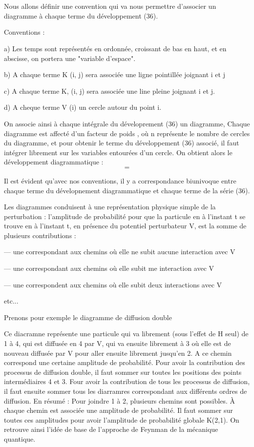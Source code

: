\section{}%

Nous allons définir une convention qui va nous permettre d'associer un diagramme à chaque terme du développement (36).

Conventions :

a) Les temps sont représentés en ordonnée, croissant de bas en
haut, et en abscisse, on portera une "variable d'espace".

b) A chaque terme K (i, j) sera associée une ligne pointillée
joignant i et j

c) A chaque terme K, (i, j) sera associée une line pleine joignant i et j.

d) A cheque terme V (i) un cercle autour du point i.

On associe ainsi à chaque intégrale du déveloprement (36) un
diagramme, Chaque diagramme est affecté d'un facteur de poids , où n
représente le nombre de cercles du diagramme, et pour obtenir le terme du
développement (36) associé, il faut intégrer librement sur les variables
entourées d'un cercle. On obtient alors le développement diagrammatique :
\[
\tag{37}=
\]

Il est évident qu'avec nos conventions, il y a correspondance
biunivoque entre chaque terme du dévelopnement diagrammatique et chaque
terme de la série (36).

Les diagrammes conduisent à une représentation physique simple de
la perturbation : l'amplitude de probabilité pour que la particule en
à l'instant t se trouve en à l'instant t, en présence du potentiel
perturbateur V, est la somme de plusieurs contributions :

— une correspondant aux chemins où elle ne subit aucune interaction avec V

— une correspondant aux chemins où elle subit me interaction avec V

— une correspondent aux chemins où elle subit deux interactions avec V

etc...

Prenons pour exemple le diagramme de diffusion double

Ce diacramne représente une particule qui va librement (sous l'effet de
H seul) de 1 à 4, qui est diffusée en 4 par V, qui va ensuite librement
à 3 où elle est de nouveau diffusée par V pour aller ensuite librement
jusqu'en 2. A ce chemin correspond une certaine amplitude de probabilité.
Pour avoir la contribution des processus de diffusion double, il faut
sommer sur toutes les positions des points intermédiaires 4 et 3. Four
avoir la contribution de tous les processus de diffusion, il faut ensuite
sommer tous les diarramres correspondant aux différents ordres de diffusion.
En résumé : Pour joindre 1 à 2, plusieurs chemins sont possibles. À chaque
chemin est associée une amplitude de probabilité. Il faut sommer sur toutes
ces amplitudes pour avoir l'amplitude de probabilité globale K(2,1).
On retrouve ainsi l'idée de base de l'approche de Feynman de la mécanique
quantique.

